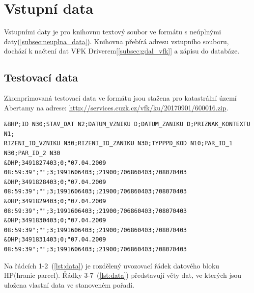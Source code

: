 \section{Vstupní data}
Vstupními daty je pro knihovnu textový soubor ve formátu  s neúplnými daty(\ref{subsec:neuplna_data}). Knihovna přebírá adresu vstupního souboru, dochází k načtení dat VFK Driverem[\ref{subsec:gdal_vfk}] a zápisu do databáze.

\subsection{Testovací data}
Zkomprimovaná testovací data ve formátu  jsou stažena pro katastrální území Abertamy na adrese: \href{http://services.cuzk.cz/vfk/ku/20170901/600016.zip}{http://services.cuzk.cz/vfk/ku/20170901/600016.zip}.
{\scriptsize
\begin{lstlisting}[caption=Ukázka bloku hranic parcel(HP) -- definice bloků a věty dat(zdroj:vlastní), label=lst:data]
&BHP;ID N30;STAV_DAT N2;DATUM_VZNIKU D;DATUM_ZANIKU D;PRIZNAK_KONTEXTU N1;
RIZENI_ID_VZNIKU N30;RIZENI_ID_ZANIKU N30;TYPPPD_KOD N10;PAR_ID_1 N30;PAR_ID_2 N30
&DHP;3491827403;0;"07.04.2009 08:59:39";"";3;1991606403;;21900;706860403;708070403 
&DHP;3491828403;0;"07.04.2009 08:59:39";"";3;1991606403;;21900;706860403;708070403
&DHP;3491829403;0;"07.04.2009 08:59:39";"";3;1991606403;;21900;706860403;708070403
&DHP;3491830403;0;"07.04.2009 08:59:39";"";3;1991606403;;21900;706860403;708070403
&DHP;3491831403;0;"07.04.2009 08:59:39";"";3;1991606403;;21900;706860403;708070403
\end{lstlisting}}
Na řádcích 1-2~(\ref{lst:data}) je rozdělený uvozovací řádek datového bloku HP(hranic parcel). Řádky 3-7~(\ref{lst:data}) představují věty dat, ve kterých jsou uložena vlastní data ve stanoveném pořadí.
